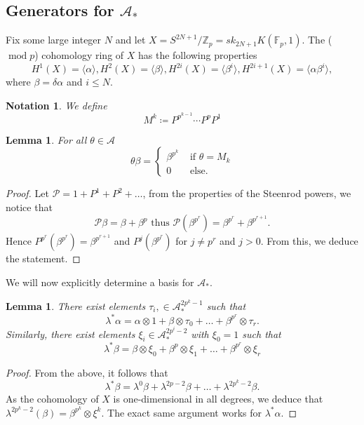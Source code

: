 \documentclass[11pt, a4paper]{article}
\DeclareMathOperator*{\cmod}{mod}
\newtheorem{notn}[thm]{Notation}
\newtheorem{lemma}[thm]{Lemma}
\theoremstyle{plain}
\newtheorem*{proof}{Proof}
\begin{document}
\subsection{Generators for $\mathcal{A}_\ast$}
Fix some large integer $N$ and let $X = S^{2N+1} / \mathbb{Z}_p = sk_{2N+1} K( \mathbb{F}_p,1) $. The ($\cmod p$)  cohomology ring of $X$ has the following properties
\[ 
H^{1}( X) = \langle \alpha \rangle, H^{2}( X) = \langle \beta \rangle, H^{2i}( X) = \langle \beta^{i}\rangle, H^{2i+1}( X) = \langle \alpha\beta^{i}\rangle,
\]
where $\beta= \delta \alpha$ and $i \leq N$. \\
\begin{notn}
We define
\[ 
M^{k} \coloneq P^{p^{k-1}}\cdots P^{p}P^{1}
\]
\end{notn}
\begin{lemma}
	For all $\theta \in \mathcal{A}$
\[ 
\theta \beta =
\begin{cases}
	\beta^{p^{k}} &\text{ if } \theta = M_k\\
	0 & \text{ else. } 
\end{cases}
\]
\end{lemma}
\begin{proof}
Let $\mathcal{P}= 1+ P^{1}+ P^{2}+ \ldots$, from the properties of the Steenrod powers, we notice that
\[ 
\mathcal{P}\beta = \beta+ \beta^{p} \text{ thus } \mathcal{P}\left( \beta^{p^{r}}\right) = \beta^{p^{r}}+ \beta^{p^{r+1}}.
\]
Hence $P^{p^{r}}( \beta^{p^{r}}) = \beta^{p^{r+1}}$ and $P^{j}( \beta^{p^{r}}) $ for $j\neq p^{r}$ and $j>0$.
From this, we deduce the statement.
\end{proof}
We will now explicitly determine a basis for $\mathcal{A}_\ast$.
\begin{lemma}
There exist elements $\tau_i,\in \mathcal{A}_\ast^{2p^{k}-1}$ such that
\[ 
\lambda^{\ast}\alpha = \alpha\otimes 1 + \beta \otimes \tau_0 + \ldots + \beta^{p^{r}}\otimes\tau_r.
\]
Similarly, there exist elements $\xi_i \in  \mathcal{A}_\ast^{2p^{i}-2}$ with $\xi_0=1$ such that
\[ 
\lambda^{\ast}\beta = \beta\otimes \xi_0 + \beta^{p}\otimes \xi_1+ \ldots  +\beta^{p^{r}}\otimes \xi_r
\]

\end{lemma}
\begin{proof}
From the above, it follows that
\[ 
\lambda^{\ast}\beta = \lambda^{0}\beta + \lambda^{2p-2}\beta+ \ldots + \lambda^{2p^{k}-2}\beta.
\]
As the cohomology of $X$ is one-dimensional in all degrees, we deduce that $\lambda^{2p^{k}-2}( \beta) = \beta^{p^{k}}\otimes \xi^{k}$. The exact same argument works for $\lambda^{\ast}\alpha$.
\end{proof}
\end{document}
